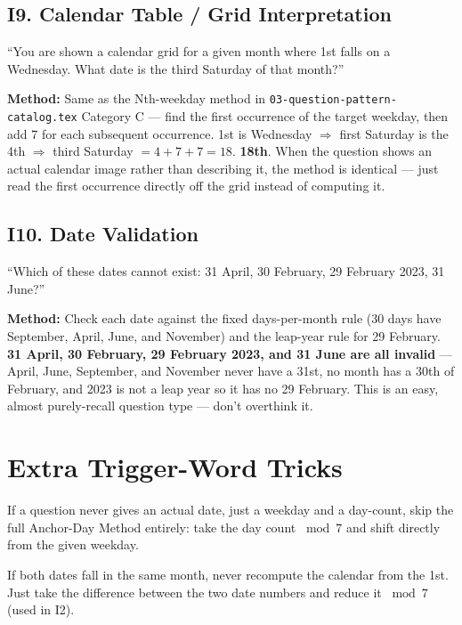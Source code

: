 \documentclass[11pt]{article}
\begin{document}
\subsection*{I9. Calendar Table / Grid Interpretation}
\begin{tipbox}[Phrasing]
``You are shown a calendar grid for a given month where 1st falls on a Wednesday. What date is the
third Saturday of that month?''
\end{tipbox}
\textbf{Method:} Same as the Nth-weekday method in \texttt{03-question-pattern-catalog.tex} Category
C --- find the first occurrence of the target weekday, then add 7 for each subsequent occurrence.
1st is Wednesday $\Rightarrow$ first Saturday is the 4th $\Rightarrow$ third Saturday
$=4+7+7=18$. \textbf{18th}. When the question shows an actual calendar image rather than describing
it, the method is identical --- just read the first occurrence directly off the grid instead of
computing it.

\subsection*{I10. Date Validation}
\begin{tipbox}[Phrasing]
``Which of these dates cannot exist: 31 April, 30 February, 29 February 2023, 31 June?''
\end{tipbox}
\textbf{Method:} Check each date against the fixed days-per-month rule (30 days have September,
April, June, and November) and the leap-year rule for 29 February. \textbf{31 April, 30 February, 29
February 2023, and 31 June are all invalid} --- April, June, September, and November never have a
31st, no month has a 30th of February, and 2023 is not a leap year so it has no 29 February. This is
an easy, almost purely-recall question type --- don't overthink it.

\section*{Extra Trigger-Word Tricks}

\begin{tipbox}
If a question never gives an actual date, just a weekday and a day-count, skip the full Anchor-Day
Method entirely: take the day count $\bmod 7$ and shift directly from the given weekday.
\end{tipbox}

\begin{tipbox}
If both dates fall in the same month, never recompute the calendar from the 1st. Just take the
difference between the two date numbers and reduce it $\bmod 7$ (used in I2).
\end{tipbox}
\end{document}

